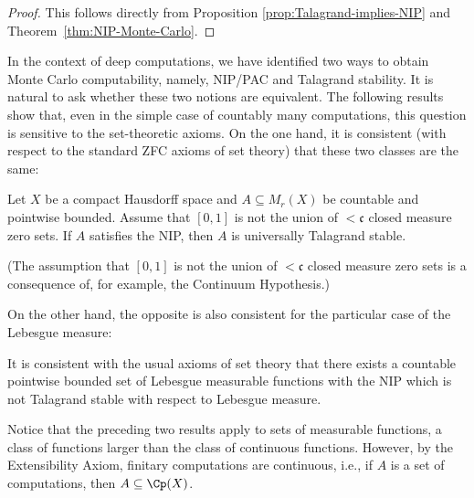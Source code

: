 \begin{proof}
    This follows directly from Proposition \ref{prop:Talagrand-implies-NIP} and Theorem~\ref{thm:NIP-Monte-Carlo}.
\end{proof}

In the context of deep computations, we have identified two ways to obtain Monte Carlo computability, namely, NIP/PAC and Talagrand stability.
It is natural to ask whether these two notions are equivalent. 
The following results show that, even in the simple case of countably many computations, this question is sensitive to the set-theoretic axioms. 
On the one hand, it is consistent (with respect to the standard ZFC axioms of set theory) that these two classes are the same:

\begin{theorem}\label{thm:NIP-implies-Talagrand-stab}
    Let $X$ be a compact Hausdorff space and $A\subseteq M_r(X)$ be countable and pointwise bounded.
    Assume that $[0,1]$ is not the union of $<\mathfrak{c}$ closed measure zero sets.
If $A$ satisfies the NIP, then $A$ is universally Talagrand stable.
\end{theorem}

(The assumption that $[0,1]$ is not the union of $<\mathfrak{c}$ closed measure zero sets is a consequence of, for example, the Continuum Hypothesis.)

On the other hand, the opposite is also consistent for the particular case of the Lebesgue measure:

\begin{theorem}
    It is consistent with the usual axioms of set theory that there exists a countable pointwise bounded set of Lebesgue measurable functions with the NIP which is not Talagrand stable with respect to Lebesgue measure.
\end{theorem}

Notice that the preceding two results apply to sets of measurable functions, a class of functions larger than the class of continuous functions.
However, by the Extensibility Axiom, finitary computations are continuous, i.e., if $A$ is a set of computations, then $A\subseteq \Cp(X)$.